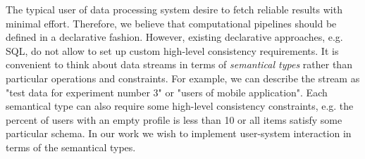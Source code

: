 The typical user of data processing system desire to fetch reliable results with minimal effort. Therefore, we believe that computational pipelines should be defined in a declarative fashion. However, existing declarative approaches, e.g. SQL, do not allow to set up custom high-level consistency requirements. It is convenient to think about data streams in terms of {\em semantical types} rather than particular operations and constraints. For example, we can describe the stream as "test data for experiment number 3" or "users of mobile application". Each semantical type can also require some high-level consistency constraints, e.g. the percent of users with an empty profile is less than 10 or all items satisfy some particular schema. In our work we wish to implement user-system interaction in terms of the semantical types.